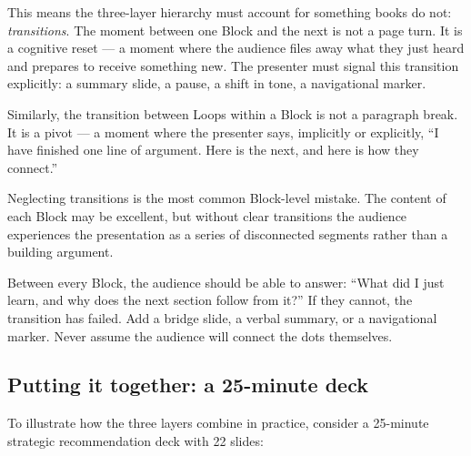 This means the three-layer hierarchy must account for something books do not: \emph{transitions}. The moment between one Block and the next is not a page turn. It is a cognitive reset --- a moment where the audience files away what they just heard and prepares to receive something new. The presenter must signal this transition explicitly: a summary slide, a pause, a shift in tone, a navigational marker.

Similarly, the transition between Loops within a Block is not a paragraph break. It is a pivot --- a moment where the presenter says, implicitly or explicitly, ``I have finished one line of argument. Here is the next, and here is how they connect.''

Neglecting transitions is the most common Block-level mistake. The content of each Block may be excellent, but without clear transitions the audience experiences the presentation as a series of disconnected segments rather than a building argument.

\begin{alertbox}
Between every Block, the audience should be able to answer: ``What did I just learn, and why does the next section follow from it?'' If they cannot, the transition has failed. Add a bridge slide, a verbal summary, or a navigational marker. Never assume the audience will connect the dots themselves.
\end{alertbox}


\subsection{Putting it together: a 25-minute deck}

To illustrate how the three layers combine in practice, consider a 25-minute strategic recommendation deck with 22 slides:

